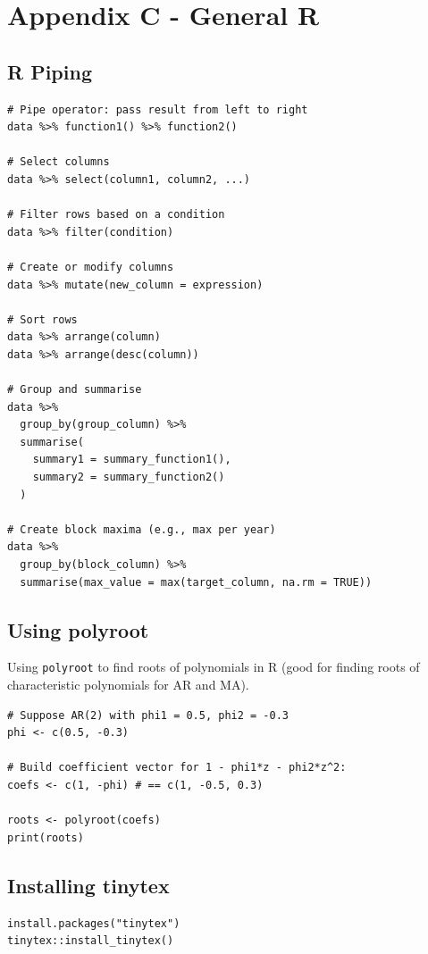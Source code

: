\documentclass[11pt]{article}
\newcommand{\noi}{\noindent}
\begin{document}
\newpage 

\section{Appendix C - General R}
\subsection{R Piping}
\begin{lstlisting}
# Pipe operator: pass result from left to right
data %>% function1() %>% function2()

# Select columns
data %>% select(column1, column2, ...)

# Filter rows based on a condition
data %>% filter(condition)

# Create or modify columns
data %>% mutate(new_column = expression)

# Sort rows
data %>% arrange(column)
data %>% arrange(desc(column))

# Group and summarise
data %>%
  group_by(group_column) %>%
  summarise(
    summary1 = summary_function1(),
    summary2 = summary_function2()
  )

# Create block maxima (e.g., max per year)
data %>%
  group_by(block_column) %>%
  summarise(max_value = max(target_column, na.rm = TRUE))
\end{lstlisting} 

\subsection{Using polyroot}
\noi Using \texttt{polyroot} to find roots of polynomials in R (good for finding roots of characteristic polynomials for AR and MA).
\begin{lstlisting}
# Suppose AR(2) with phi1 = 0.5, phi2 = -0.3
phi <- c(0.5, -0.3)

# Build coefficient vector for 1 - phi1*z - phi2*z^2:
coefs <- c(1, -phi) # == c(1, -0.5, 0.3)

roots <- polyroot(coefs)
print(roots)
\end{lstlisting}

\subsection{Installing tinytex}
\begin{lstlisting}
install.packages("tinytex")
tinytex::install_tinytex()
\end{lstlisting}
\end{document}
